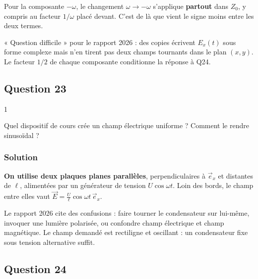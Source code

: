 \documentclass[11pt,a4paper]{article}
\begin{document}
\begin{piege}

Pour la composante \(-\omega\), le changement \(\omega\to-\omega\) s'applique \textbf{partout} dans \(Z_0\), y compris au facteur \(1/\omega\) placé devant. C'est de là que vient le signe moins entre les deux termes.

\end{piege}

\begin{jury}

« Question difficile » pour le rapport 2026 : des copies écrivent \(E_x(t)\) sous forme complexe mais n'en tirent pas deux champs tournants dans le plan \((x,y)\). Le facteur \(1/2\) de chaque composante conditionne la réponse à Q24.

\end{jury}

\hypertarget{question-23}{%
\subsection{Question 23}\label{question-23}}

\begin{indication}{1}

Quel dispositif de cours crée un champ électrique uniforme ? Comment le rendre sinusoïdal ?

\end{indication}

\hypertarget{solution-22}{%
\subsubsection{Solution}\label{solution-22}}

\textbf{On utilise deux plaques planes parallèles}, perpendiculaires à \(\vec e_x\) et distantes de \(\ell\), alimentées par un générateur de tension \(U\cos\omega t\). Loin des bords, le champ entre elles vaut \(\vec E=\frac U\ell\cos\omega t\,\vec e_x\).

\begin{piege}

Le rapport 2026 cite des confusions : faire tourner le condensateur sur lui-même, invoquer une lumière polarisée, ou confondre champ électrique et champ magnétique. Le champ demandé est rectiligne et oscillant : un condensateur fixe sous tension alternative suffit.

\end{piege}

\hypertarget{question-24}{%
\subsection{Question 24}\label{question-24}}
\end{document}
